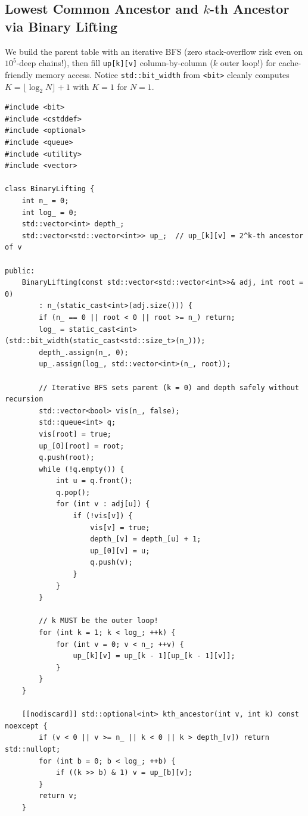 \documentclass[11pt,a4paper]{article}
\theoremstyle{definition}
\begin{document}
\subsection{Lowest Common Ancestor and \texorpdfstring{$k$}{k}-th Ancestor via Binary Lifting}

We build the parent table with an iterative BFS (zero stack-overflow risk even on $10^5$-deep chains!), then fill \texttt{up[k][v]} column-by-column ($k$ outer loop!) for cache-friendly memory access. Notice \texttt{std::bit\_width} from \texttt{<bit>} cleanly computes $K = \lfloor \log_2 N \rfloor + 1$ with $K = 1$ for $N = 1$.

\begin{lstlisting}[caption={Iterative-build Binary Lifting class supporting LCA, path distance, and $k$-th ancestor.}]
#include <bit>
#include <cstddef>
#include <optional>
#include <queue>
#include <utility>
#include <vector>

class BinaryLifting {
    int n_ = 0;
    int log_ = 0;
    std::vector<int> depth_;
    std::vector<std::vector<int>> up_;  // up_[k][v] = 2^k-th ancestor of v

public:
    BinaryLifting(const std::vector<std::vector<int>>& adj, int root = 0)
        : n_(static_cast<int>(adj.size())) {
        if (n_ == 0 || root < 0 || root >= n_) return;
        log_ = static_cast<int>(std::bit_width(static_cast<std::size_t>(n_)));
        depth_.assign(n_, 0);
        up_.assign(log_, std::vector<int>(n_, root));

        // Iterative BFS sets parent (k = 0) and depth safely without recursion
        std::vector<bool> vis(n_, false);
        std::queue<int> q;
        vis[root] = true;
        up_[0][root] = root;
        q.push(root);
        while (!q.empty()) {
            int u = q.front();
            q.pop();
            for (int v : adj[u]) {
                if (!vis[v]) {
                    vis[v] = true;
                    depth_[v] = depth_[u] + 1;
                    up_[0][v] = u;
                    q.push(v);
                }
            }
        }

        // k MUST be the outer loop!
        for (int k = 1; k < log_; ++k) {
            for (int v = 0; v < n_; ++v) {
                up_[k][v] = up_[k - 1][up_[k - 1][v]];
            }
        }
    }

    [[nodiscard]] std::optional<int> kth_ancestor(int v, int k) const noexcept {
        if (v < 0 || v >= n_ || k < 0 || k > depth_[v]) return std::nullopt;
        for (int b = 0; b < log_; ++b) {
            if ((k >> b) & 1) v = up_[b][v];
        }
        return v;
    }


\end{lstlisting}
\end{document}

